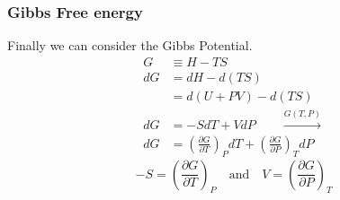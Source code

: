 \documentclass{article}
\begin{document}
\subsubsection*{Gibbs Free energy}
Finally we can consider the Gibbs Potential.
\begin{equation}
    \begin{split}
    G &\equiv H - TS \\
        dG &= dH - d(TS) \\
          &= d(U+PV) - d(TS) \\
          dG &= -SdT + VdP \qquad \xrightarrow{G(T,P)}\\
        dG &= \left(\frac{\partial G}{\partial T}\right)_P dT + \left(\frac{\partial G}{\partial P}\right)_T dP
    \end{split}
\end{equation}
\begin{equation*}
     -S= \left(\frac{\partial G}{\partial T}\right)_P \quad \text{and} \quad V = \left(\frac{\partial G}{\partial P}\right)_T
\end{equation*}
\end{document}
